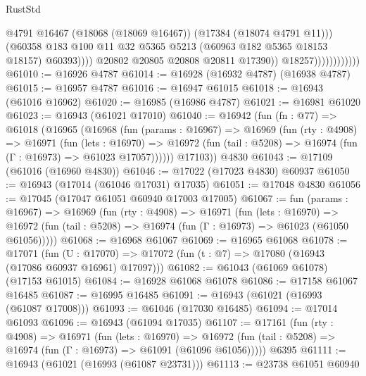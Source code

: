 \begin{lexlean}{RustStd}
\begin{coremodule}
                                        @4791
                                        @16467
                                        (@18068 (@18069 @16467))
                                        (@17384 (@18074 @4791 @11)))
                                      (@60358
                                        @183
                                        @100
                                        @11
                                        @32
                                        @5365
                                        @5213
                                        (@60963 @182 @5365 @18153 @18157)
                                        @60393))))
                                @20802
                                @20805
                                @20808
                                @20811
                                @17390))
                            @18257))))))))))))
@61010 := @16926 @4787
@61014 := @16928 (@16932 @4787) (@16938 @4787)
@61015 := @16957 @4787
@61016 := @16947 @61015
@61018 := @16943 (@61016 @16962)
@61020 := @16985 (@16986 @4787)
@61021 := @16981 @61020
@61023 := @16943 (@61021 @17010)
@61040 := @16942
    (fun (fn : @77) =>
    @61018
      (@16965
        (@16968
          (fun (params : @16967) =>
          @16969
            (fun (rty : @4908) =>
            @16971
              (fun (lets : @16970) =>
              @16972 (fun (tail : @5208) => @16974 (fun (Γ : @16973) => @61023 @17057))))))
        @17103))
    @4830
@61043 := @17109 (@61016 (@16960 @4830))
@61046 := @17022 (@17023 @4830) @60937
@61050 := @16943 (@17014 (@61046 @17031) @17035)
@61051 := @17048 @4830
@61056 := @17045 (@17047 @61051 @60940 @17003 @17005)
@61067 := fun (params : @16967) =>
  @16969
    (fun (rty : @4908) =>
    @16971
      (fun (lets : @16970) =>
      @16972 (fun (tail : @5208) => @16974 (fun (Γ : @16973) => @61023 (@61050 @61056)))))
@61068 := @16968 @61067
@61069 := @16965 @61068
@61078 := @17071
    (fun (U : @17070) => @17072 (fun (t : @7) => @17080 (@16943 (@17086 @60937 @16961) @17097)))
@61082 := @61043 (@61069 @61078) (@17153 @61015)
@61084 := @16928 @61068 @61078
@61086 := @17158 @61067 @16485
@61087 := @16995 @16485
@61091 := @16943 (@61021 (@16993 (@61087 @17008)))
@61093 := @61046 (@17030 @16485)
@61094 := @17014 @61093
@61096 := @16943 (@61094 @17035)
@61107 := @17161
    (fun (rty : @4908) =>
    @16971
      (fun (lets : @16970) =>
      @16972 (fun (tail : @5208) => @16974 (fun (Γ : @16973) => @61091 (@61096 @61056)))))
    @6395
@61111 := @16943 (@61021 (@16993 (@61087 @23731)))
@61113 := @23738 @61051 @60940

\end{coremodule}
\end{lexlean}
